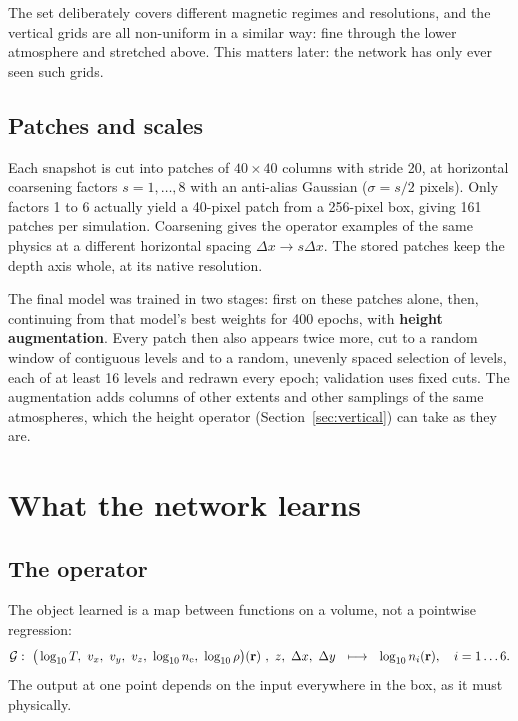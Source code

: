 The set deliberately covers different magnetic regimes and resolutions, and the vertical grids are all non-uniform in a similar way: fine through the lower atmosphere and stretched above. This matters later: the network has only ever seen such grids.

\subsection{Patches and scales}
Each snapshot is cut into patches of $40\times40$ columns with stride 20, at horizontal coarsening factors $s=1,\dots,8$ with an anti-alias Gaussian ($\sigma=s/2$ pixels). Only factors 1 to 6 actually yield a 40-pixel patch from a 256-pixel box, giving 161 patches per simulation. Coarsening gives the operator examples of the same physics at a different horizontal spacing $\Delta x\to s\Delta x$. The stored patches keep the depth axis whole, at its native resolution.

The final model was trained in two stages: first on these patches alone, then, continuing from that model's best weights for 400 epochs, with \textbf{height augmentation}. Every patch then also appears twice more, cut to a random window of contiguous levels and to a random, unevenly spaced selection of levels, each of at least 16 levels and redrawn every epoch; validation uses fixed cuts. The augmentation adds columns of other extents and other samplings of the same atmospheres, which the height operator (Section~\ref{sec:vertical}) can take as they are.

\section{What the network learns}\label{sec:target}

\subsection{The operator}
The object learned is a map between functions on a volume, not a pointwise regression:
\begin{equation}
\mathcal G:\ \big(\log_{10}T,\ v_x,\ v_y,\ v_z,\ \log_{10}\nel,\ \log_{10}\rho\big)(\mathbf r)\ ,\ z,\ \Delta x,\ \Delta y\ \ \longmapsto\ \ \log_{10}n_i(\mathbf r),\quad i=1\dots6 .
\end{equation}
The output at one point depends on the input everywhere in the box, as it must physically.

